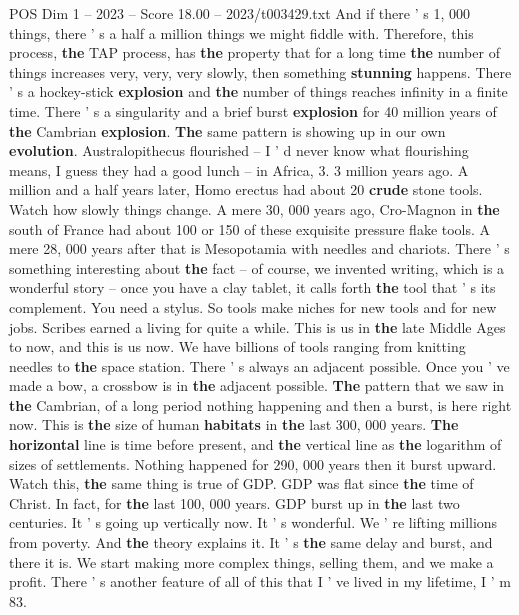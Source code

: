 \begin{textsample}{POS Dim 1 – 2023 – Score 18.00 – 2023/t003429.txt}
And if there ' s 1, 000 things, there ' s a half a million things we might fiddle with.
Therefore, this process, \textbf{the} TAP process, has \textbf{the} property that for a long time \textbf{the} number of things increases very, very, very slowly, then something \textbf{stunning} happens.
There ' s a hockey-stick \textbf{explosion} and \textbf{the} number of things reaches infinity in a finite time.
There ' s a singularity and a brief burst \textbf{explosion} for 40 million years of \textbf{the} Cambrian \textbf{explosion}. \textbf{The} same pattern is showing up in our own \textbf{evolution}.
Australopithecus flourished -- I ' d never know what flourishing means, I guess they had a good lunch -- in Africa, 3. 3 million years ago.
A million and a half years later, Homo erectus had about 20 \textbf{crude} stone tools.
Watch how slowly things change.
A mere 30, 000 years ago, Cro-Magnon in \textbf{the} south of France had about 100 or 150 of these exquisite pressure flake tools.
A mere 28, 000 years after that is Mesopotamia with needles and chariots.
There ' s something interesting about \textbf{the} fact -- of course, we invented writing, which is a wonderful story -- once you have a clay tablet, it calls forth \textbf{the} tool that ' s its complement.
You need a stylus.
So tools make niches for new tools and for new jobs.
Scribes earned a living for quite a while.
This is us in \textbf{the} late Middle Ages to now, and this is us now.
We have billions of tools ranging from knitting needles to \textbf{the} space station.
There ' s always an adjacent possible.
Once you ' ve made a bow, a crossbow is in \textbf{the} adjacent possible. \textbf{The} pattern that we saw in \textbf{the} Cambrian, of a long period nothing happening and then a burst, is here right now.
This is \textbf{the} size of human \textbf{habitats} in \textbf{the} last 300, 000 years. \textbf{The} \textbf{horizontal} line is time before present, and \textbf{the} vertical line as \textbf{the} logarithm of sizes of settlements.
Nothing happened for 290, 000 years then it burst upward.
Watch this, \textbf{the} same thing is true of GDP.
GDP was flat since \textbf{the} time of Christ.
In fact, for \textbf{the} last 100, 000 years.
GDP burst up in \textbf{the} last two centuries.
It ' s going up vertically now.
It ' s wonderful.
We ' re lifting millions from poverty.
And \textbf{the} theory explains it.
It ' s \textbf{the} same delay and burst, and there it is.
We start making more complex things, selling them, and we make a profit.
There ' s another feature of all of this that I ' ve lived in my lifetime, I ' m 83.

\end{textsample}
